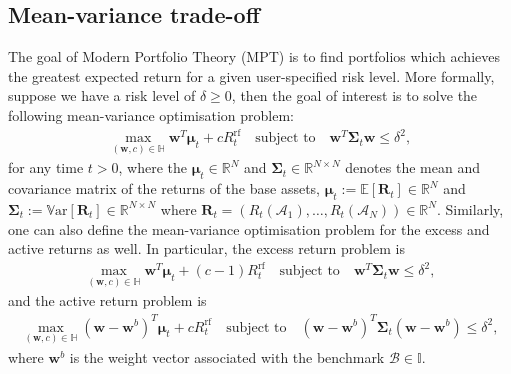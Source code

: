 \documentclass[12pt]{article}
\begin{document}
\subsection{Mean-variance trade-off}
\label{sec:mean_variance}
The goal of Modern Portfolio Theory (MPT) \citep{markowitz1952jf} is to find portfolios which achieves the greatest expected return for a given user-specified risk level. More formally, suppose we have a risk level of $\delta \geq 0$, then the goal of interest is to solve the following mean-variance optimisation problem:
\begin{align}
	\max_{(\mathbf{w}, c) \in \mathbb{H}} \mathbf{w}^T \boldsymbol{\mu}_t + c R_t^{\text{rf}}   
	\quad
	\text{subject to}
	\quad 
	\mathbf{w}^T\boldsymbol{\Sigma}_t \mathbf{w} \leq \delta^2,
	\label{eqn:mean_variance_problem}
\end{align}
for any time $t > 0$, where the $\boldsymbol{\mu}_t \in \mathbb{R}^N$ and $\boldsymbol{\Sigma}_t \in \mathbb{R}^{N \times N}$ denotes the mean and covariance matrix of the returns of the base assets, $\boldsymbol{\mu}_t := \mathbb{E}[\mathbf{R}_t] \in \mathbb{R}^N$ and $\boldsymbol{\Sigma}_t := \mathbb{V}\text{ar}[\mathbf{R}_t] \in \mathbb{R}^{N \times N}$ where $\mathbf{R}_t = (R_t(\mathcal{A}_1), \dots, R_t(\mathcal{A}_N)) \in \mathbb{R}^N$. Similarly, one can also define the mean-variance optimisation problem for the excess and active returns as well. In particular, the excess return problem is
\begin{align}
	\max_{(\mathbf{w}, c) \in \mathbb{H}} \mathbf{w}^T \boldsymbol{\mu}_t + (c - 1) R_t^{\text{rf}}   
	\quad
	\text{subject to}
	\quad 
	\mathbf{w}^T\boldsymbol{\Sigma}_t \mathbf{w} \leq \delta^2,
\end{align}
and the active return problem is
\begin{align}
	\max_{(\mathbf{w}, c) \in \mathbb{H}} (\mathbf{w} - \mathbf{w}^b)^T \boldsymbol{\mu}_t + c R_t^{\text{rf}}   
	\quad
	\text{subject to}
	\quad 
	(\mathbf{w} - \mathbf{w}^b)^T\boldsymbol{\Sigma}_t (\mathbf{w} - \mathbf{w}^b) \leq \delta^2,
\end{align}
where $\mathbf{w}^b$ is the weight vector associated with the benchmark $\mathcal{B} \in \mathbb{I}$.
\end{document}
